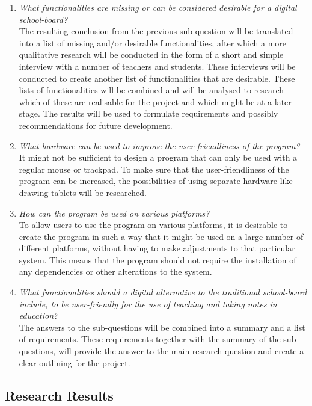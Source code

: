 \documentclass[a4paper,12pt]{article}
\begin{document}
\begin{enumerate}
\item \textit{What functionalities are missing or can be considered desirable for a digital school-board?}\\
  The resulting conclusion from the previous sub-question will be translated into a list of missing and/or desirable functionalities, after which a more qualitative research will be conducted in the form of a short and simple interview with a number of teachers and students. These interviews will be conducted to create another list of functionalities that are desirable. These lists of functionalities will be combined and will be analysed to research which of these are realisable for the project and which might be at a later stage. The results will be used to formulate requirements and possibly recommendations for future development.
  
\item \textit{What hardware can be used to improve the user-friendliness of the program?}\\
  It might not be sufficient to design a program that can only be used with a regular mouse or trackpad. To make sure that the user-friendliness of the program can be increased, the possibilities of using separate hardware like drawing tablets will be researched.
  
\item \textit{How can the program be used on various platforms?}\\
  To allow users to use the program on various platforms, it is desirable to create the program in such a way that it might be used on a large number of different platforms, without having to make adjustments to that particular system. This means that the program should not require the installation of any dependencies or other alterations to the system.

\item[] \textit{What functionalities should a digital alternative to the traditional school-board include, to be user-friendly for the use of teaching and taking notes in education?}\\
  The answers to the sub-questions will be combined into a summary and a list of requirements. These requirements together with the summary of the sub-questions, will provide the answer to the main research question and create a clear outlining for the project.
  
\end{enumerate}


\subsection{Research Results}
\end{document}
